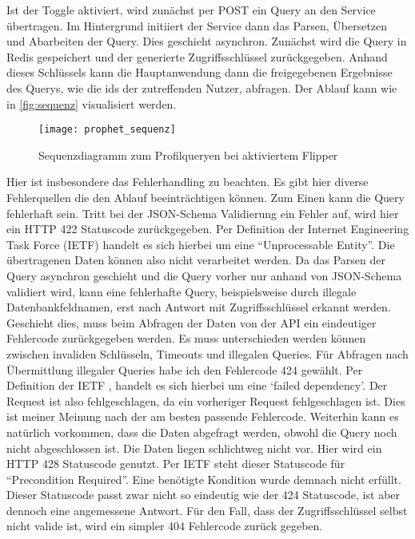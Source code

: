 Ist der Toggle aktiviert, wird zunächst per POST ein Query an den Service übertragen. Im Hintergrund initiiert der Service dann das Parsen, Übersetzen und Abarbeiten der Query. Dies geschieht asynchron. Zunächst wird die Query in Redis gespeichert und der generierte Zugriffsschlüssel zurückgegeben.
Anhand dieses Schlüssels kann die Hauptanwendung dann die freigegebenen Ergebnisse des Querys, wie die ids der zutreffenden Nutzer, abfragen. Der Ablauf kann wie in \autoref{fig:sequenz} visualisiert werden.

\begin{figure}[!ht]
    \centering
    \caption{Sequenzdiagramm zum Profilqueryen bei aktiviertem Flipper}
    \label{fig:sequenz}
    \texttt{[image: prophet\_sequenz]}
\end{figure}

Hier ist insbesondere das Fehlerhandling zu beachten. Es gibt hier diverse Fehlerquellen die den Ablauf beeinträchtigen können. Zum Einen kann die Query fehlerhaft sein. 
Tritt bei der JSON-Schema Validierung ein Fehler auf, wird hier ein HTTP 422 Statuscode zurückgegeben. Per Definition der Internet Engineering Task Force (IETF) \cite{ietf:424} handelt es sich hierbei um eine ``Unprocessable Entity''. Die übertragenen Daten können also nicht verarbeitet werden.
Da das Parsen der Query asynchron geschieht und die Query vorher nur anhand von JSON-Schema validiert wird, kann eine fehlerhafte Query, beispielsweise durch illegale Datenbankfeldnamen, erst nach Antwort mit Zugriffsschlüssel erkannt werden. Geschieht dies, muss beim Abfragen der Daten von der API ein eindeutiger Fehlercode zurückgegeben werden. Es muss unterschieden werden können zwischen invaliden Schlüsseln, Timeouts und illegalen Queries. Für Abfragen nach Übermittlung illegaler Queries habe ich den Fehlercode 424 gewählt. Per Definition der IETF \cite{ietf:424}, handelt es sich hierbei um eine `failed dependency'. Der Request ist also fehlgeschlagen, da ein vorheriger Request fehlgeschlagen ist. Dies ist meiner Meinung nach der am besten passende Fehlercode.
Weiterhin kann es natürlich vorkommen, dass die Daten abgefragt werden, obwohl die Query noch nicht abgeschlossen ist. Die Daten liegen schlichtweg nicht vor. Hier wird ein HTTP 428 Statuscode genutzt. Per IETF \cite{ietf:428} steht dieser Statuscode für ``Precondition Required''. Eine benötigte Kondition wurde demnach nicht erfüllt. Dieser Statuscode passt zwar nicht so eindeutig wie der 424 Statuscode, ist aber dennoch eine angemessene Antwort.
Für den Fall, dass der Zugriffsschlüssel selbst nicht valide ist, wird ein simpler 404 Fehlercode zurück gegeben.

